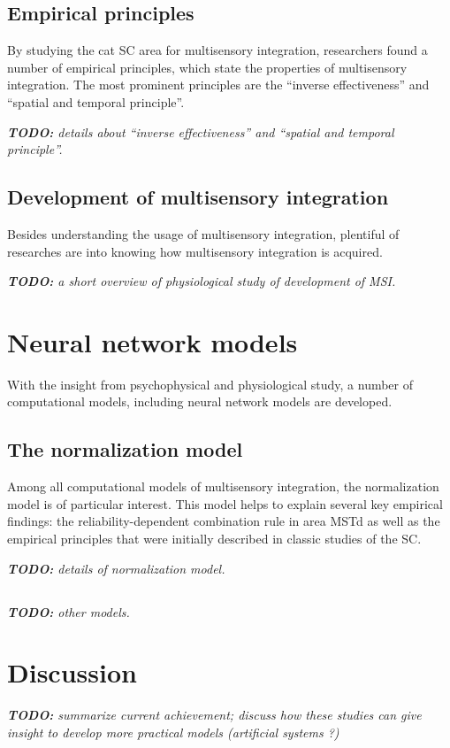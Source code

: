 \documentclass{article}[11pt]
\newcommand{\TODO}[1]{\emph{\small{{\bf TODO: } #1}}}
\begin{document}
\subsection{Empirical principles}
By studying the cat SC area for multisensory integration, researchers found a number of empirical principles, which state the properties of multisensory integration\cite{meredith_interactions_1983}. The most prominent principles are the ``inverse effectiveness'' and ``spatial and temporal principle''.

\TODO{details about ``inverse effectiveness'' and ``spatial and temporal principle''.}

\subsection{Development of multisensory integration}
Besides understanding the usage of multisensory integration, plentiful of researches are into knowing how multisensory integration is acquired. 

\TODO{a short overview of physiological study of development of MSI.}

\section{Neural network models}
With the insight from psychophysical and physiological study, a number of computational models, including neural network models are developed. 

\subsection{The normalization model}
Among all computational models of multisensory integration, the normalization model\cite{ohshiro_normalization_2011} is of particular interest. This model helps to explain several key empirical findings: the reliability-dependent combination rule in area MSTd as well as
the empirical principles that were initially described in classic studies of the SC.

\TODO{details of normalization model.}

\subsection{}
\TODO{other models.}

\section{Discussion}
\TODO{summarize current achievement; discuss how these studies can give insight to develop more practical models (artificial systems ?)}



\end{document}
